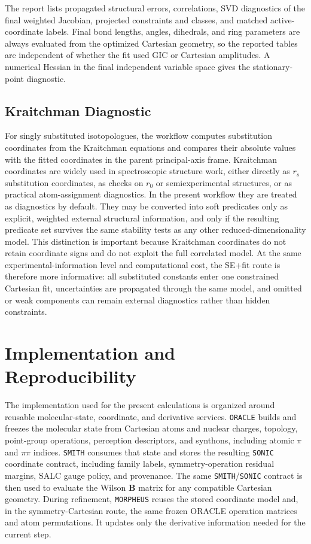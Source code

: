\documentclass[aip,jcp,reprint,longbibliography,floatfix]{revtex4-2}
\begin{document}
The report lists propagated structural errors, correlations, SVD diagnostics of
the final weighted Jacobian, projected constraints and classes, and matched
active-coordinate labels. Final bond lengths, angles, dihedrals, and ring
parameters are always evaluated from the optimized Cartesian geometry, so the
reported tables are independent of whether the fit used GIC or Cartesian
amplitudes. A numerical Hessian in the final independent variable space gives
the stationary-point diagnostic.


\subsection{Kraitchman Diagnostic}

For singly substituted isotopologues, the workflow computes substitution
coordinates from the Kraitchman equations\cite{Kraitchman1953} and compares
their absolute values with the fitted coordinates in the parent principal-axis
frame. Kraitchman coordinates are widely used in spectroscopic structure work,
either directly as $r_s$ substitution coordinates, as checks on $r_0$ or
semiexperimental structures, or as practical atom-assignment diagnostics. In
the present workflow they are treated as diagnostics by default. They may be
converted into soft predicates only as explicit, weighted external structural
information, and only if the resulting predicate set survives the same
stability tests as any other reduced-dimensionality model. This distinction is
important because Kraitchman coordinates do not retain coordinate signs and do
not exploit the full correlated model. At the same experimental-information
level and computational cost, the SE+fit route is therefore more informative:
all substituted constants enter one constrained Cartesian fit, uncertainties
are propagated through the same model, and omitted or weak components can
remain external diagnostics rather than hidden constraints.


\section{Implementation and Reproducibility}

The implementation used for the present calculations is organized around
reusable molecular-state, coordinate, and derivative services. \texttt{ORACLE}
builds and freezes the molecular state from Cartesian atoms and nuclear
charges, topology, point-group operations, perception descriptors, and
synthons, including atomic $\pi$ and $\pi\pi$ indices.  \texttt{SMITH}
consumes that state and stores the resulting
\texttt{SONIC} coordinate contract,
including family labels, symmetry-operation residual margins, SALC gauge
policy, and provenance. The same \texttt{SMITH}/\texttt{SONIC} contract is
then used to evaluate the Wilson $\mathbf{B}$ matrix for any compatible
Cartesian geometry. During refinement, \texttt{MORPHEUS} reuses the stored
coordinate model and, in the symmetry-Cartesian route, the same frozen ORACLE
operation matrices and atom permutations.  It updates only the derivative
information needed for the current step.
\end{document}
